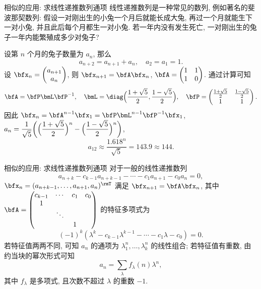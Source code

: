 \begin{frame}{相似的应用: 求线性递推数列通项\noexer}
\beqskip{1pt}
	\onslide<+->
	线性递推数列是一种常见的数列,
	\onslide<+->
	例如著名的斐波那契数列: 假设一对刚出生的小兔一个月后就能长成大兔, 再过一个月就能生下一对小兔, 并且此后每个月都生一对小兔.
	若一年内没有发生死亡, 一对刚出生的兔子一年内能繁殖成多少对兔子?

	\onslide<+->
	设第 $n$ 个月的兔子数量为 $a_n$, 那么
	\[a_{n+2}=a_{n+1}+a_n,\quad a_2=a_1=1.\]
	\onslide<+->
	设 $\bfx_n=\begin{pmatrix}
		a_{n+1}\\a_n
	\end{pmatrix}$, 则 $\bfx_{n+1}=\bfA\bfx_n$, $\bfA=\begin{pmatrix}
		1&1\\
		1&0
	\end{pmatrix}$.
	\onslide<+->
	通过计算可知
	\[\bfA=\bfP\bmL\bfP^{-1},\quad
	\bmL=\diag\Bigl(\frac{1+\sqrt5}2,\frac{1-\sqrt5}2\Bigr), \quad \bfP=\begin{pmatrix}
		\frac{1+\sqrt5}2&\frac{1-\sqrt5}2\\
		1&1
	\end{pmatrix}.\]
	\onslide<+->
	因此
	$\bfx_n=\bfA^{n-1}\bfx_1=\bfP\bmL^{n-1}\bfP^{-1}\bfx_1$,
	$\displaystyle a_n=\frac1{\sqrt5}\biggl(\Bigl(\frac{1+\sqrt5}2\Bigr)^n-\Bigl(\frac{1-\sqrt5}2\Bigr)^n\biggr)$,
	\onslide<+->
	\[a_{12}\approx \frac{1.618^n}{\sqrt5}=143.9\approx144.\]
\endgroup
\end{frame}


\begin{frame}{相似的应用: 求线性递推数列通项\noexer}
	\onslide<+->
	对于一般的线性递推数列
	\[a_{n+k}-c_{k-1}a_{n+k-1}-\cdots-c_1a_{n+1}-c_0a_n=0,\]
	\onslide<+->
	$\bfx_n=(a_{n+k-1},\dots,a_{n+1},a_n)^\rmT$ 满足 $\bfx_{n+1}=\bfA\bfx_n$, 其中 $\bfA=\begin{pmatrix}
		c_{k-1}&\cdots&c_1&c_0\\
		1&&&\\
		&\ddots&&\\
		&&1&
	\end{pmatrix}$ 的特征多项式为
	\[(-1)^k(\lambda^k-c_{k-1}\lambda^{k-1}-\cdots-c_1\lambda-c_0)=0.\]
	\onslide<+->
	若特征值两两不同, 可知 $a_n$ 的通项为 $\lambda_1^n,\dots,\lambda_k^n$ 的线性组合;
	\onslide<+->
	若特征值有重数, 由约当块的幂次形式可知
	\[a_n=\sum_\lambda f_\lambda(n)\lambda^n,\]
	其中 $f_\lambda$ 是多项式, 且次数不超过 $\lambda$ 的重数 $-1$.
\end{frame}



